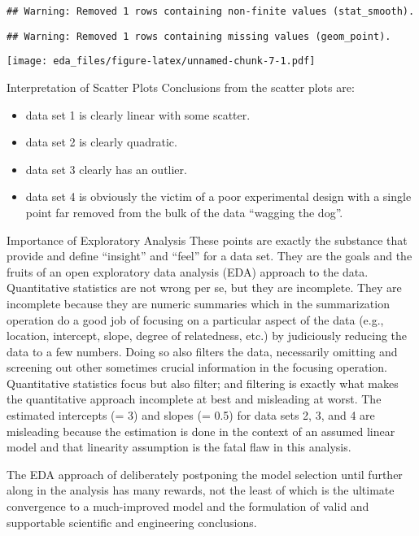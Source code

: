 \documentclass[]{book}
\providecommand{\tightlist}{%
  \setlength{\itemsep}{0pt}\setlength{\parskip}{0pt}}
\theoremstyle{definition}
\theoremstyle{definition}
\theoremstyle{definition}
\theoremstyle{remark}
\begin{document}
\begin{verbatim}
## Warning: Removed 1 rows containing non-finite values (stat_smooth).
\end{verbatim}

\begin{verbatim}
## Warning: Removed 1 rows containing missing values (geom_point).
\end{verbatim}

\texttt{[image: eda\_files/figure-latex/unnamed-chunk-7-1.pdf]}

Interpretation of Scatter Plots Conclusions from the scatter plots are:

\begin{itemize}
\tightlist
\item
  data set 1 is clearly linear with some scatter.
\item
  data set 2 is clearly quadratic.
\item
  data set 3 clearly has an outlier.
\item
  data set 4 is obviously the victim of a poor experimental design with
  a single point far removed from the bulk of the data ``wagging the
  dog''.
\end{itemize}

Importance of Exploratory Analysis These points are exactly the
substance that provide and define ``insight'' and ``feel'' for a data
set. They are the goals and the fruits of an open exploratory data
analysis (EDA) approach to the data. Quantitative statistics are not
wrong per se, but they are incomplete. They are incomplete because they
are numeric summaries which in the summarization operation do a good job
of focusing on a particular aspect of the data (e.g., location,
intercept, slope, degree of relatedness, etc.) by judiciously reducing
the data to a few numbers. Doing so also filters the data, necessarily
omitting and screening out other sometimes crucial information in the
focusing operation. Quantitative statistics focus but also filter; and
filtering is exactly what makes the quantitative approach incomplete at
best and misleading at worst. The estimated intercepts (= 3) and slopes
(= 0.5) for data sets 2, 3, and 4 are misleading because the estimation
is done in the context of an assumed linear model and that linearity
assumption is the fatal flaw in this analysis.

The EDA approach of deliberately postponing the model selection until
further along in the analysis has many rewards, not the least of which
is the ultimate convergence to a much-improved model and the formulation
of valid and supportable scientific and engineering conclusions.
\end{document}
